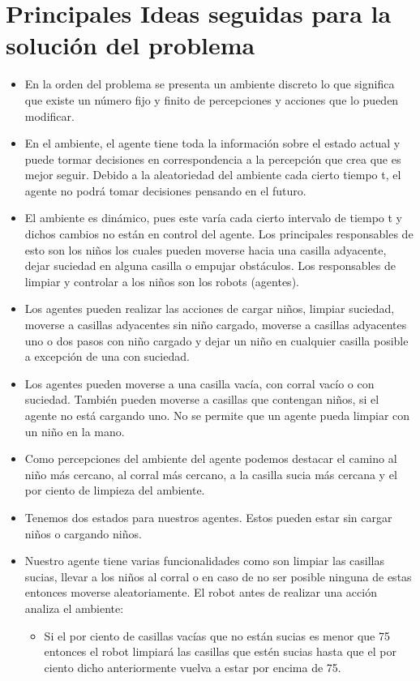 \documentclass[a4paper,10pt]{article}
\begin{document}
 \section*{Principales Ideas seguidas para la solución del problema}
\begin{itemize}
	\item En la orden del problema se presenta un ambiente discreto lo que significa que existe un número fijo y finito de percepciones y acciones que lo pueden modificar.
	
	\item En el ambiente, el agente tiene toda la informaci\'on sobre el estado actual y puede tormar decisiones en correspondencia a la percepci\'on que crea que es mejor seguir. Debido a la aleatoriedad del ambiente cada cierto tiempo t, el agente no podr\'a tomar decisiones pensando en el futuro. 
	
	\item El ambiente es din\'amico, pues este var\'ia cada cierto intervalo de tiempo t y dichos cambios no est\'an en control del agente. Los principales responsables de esto son los ni\~nos los cuales pueden moverse hacia una casilla adyacente, dejar suciedad en alguna casilla o empujar obst\'aculos. Los responsables de limpiar y controlar a los ni\~nos son los robots (agentes).
	
	\item Los agentes pueden realizar las acciones de cargar ni\~nos, limpiar suciedad, moverse a casillas adyacentes sin ni\~no cargado, moverse a casillas adyacentes uno o dos pasos con ni\~no cargado y dejar un ni\~no en cualquier casilla posible a excepci\'on de una con suciedad.
	
	\item Los agentes pueden moverse a una casilla vacía, con corral vacío o con suciedad. También pueden moverse a casillas que contengan niños, si el agente no está cargando uno. No se permite que un agente pueda limpiar con un niño en la mano.
	
	\item Como percepciones del ambiente del agente podemos destacar el camino al ni\~no m\'as cercano, al corral m\'as cercano, a la casilla sucia m\'as cercana y el por ciento de limpieza del ambiente.
	
	\item Tenemos dos estados para nuestros agentes. Estos pueden estar sin cargar ni\~nos o cargando ni\~nos.
	
	\item Nuestro agente tiene varias funcionalidades como son limpiar las casillas sucias, llevar a los ni\~nos al corral o en caso de no ser posible ninguna de estas entonces moverse aleatoriamente. El robot antes de realizar una acci\'on analiza el ambiente:
		\begin{itemize}
			\item Si el por ciento de casillas vac\'ias que no est\'an sucias es menor que 75 entonces el robot limpiar\'a las casillas que est\'en sucias hasta que el por ciento dicho anteriormente vuelva a estar por encima de 75.
			

\end{itemize}
\end{itemize}
\end{document}
